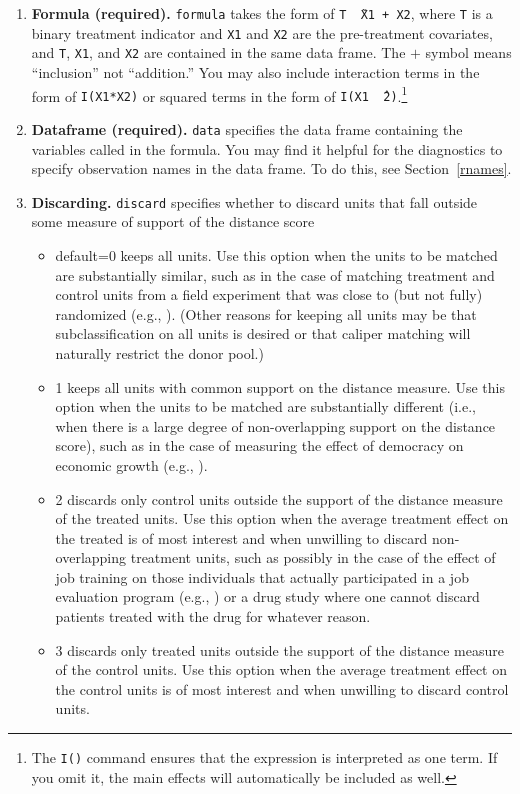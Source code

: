 \documentclass[oneside,letterpaper,titlepage]{article}
\begin{document}
\begin{enumerate}

\item \textbf{Formula (required).}  \texttt{formula}  takes the form of {\tt T \~\ X1 + X2}, where
  {\tt T} is a binary treatment indicator and {\tt X1} and {\tt X2} are
  the pre-treatment covariates, and {\tt T}, {\tt X1}, and {\tt X2}
  are contained in the same data frame.  The $+$ symbol means
  ``inclusion'' not ``addition.'' You may also include
  interaction terms in the form of {\tt I(X1*X2)} or squared terms in
  the form of {\tt I(X1 \^\ 2)}.\footnote{The \texttt{I()} command
  ensures that the expression is interpreted as one term.  If you omit
  it, the main effects will automatically be included as well.} 
  
\item \textbf{Dataframe (required).}  \texttt{data} specifies the data frame containing the
  variables called in the formula.  You may find it helpful for the
  diagnostics to specify observation names in the data frame.  To do
  this, see Section~\ref{rnames}.

\item \textbf{Discarding.} \texttt{discard} specifies whether to discard units that
  fall outside some measure of support of the distance score
  \begin{itemize}
  \item default=0 keeps all units.  Use this
    option when the units to be matched are substantially similar,
    such as in the case of matching treatment and control units from a
    field experiment that was close to (but not fully) randomized
    (e.g., \citealt{Imai03}).  (Other reasons for
    keeping all units may be that subclassification on all units is
    desired or that caliper matching will naturally restrict the donor
    pool.)
  \item  1 keeps all units with common support on the distance
    measure. Use this option when the units to be
    matched are substantially different (i.e., when there is a large
    degree of non-overlapping support on the distance score), such as
    in the case of measuring the effect of democracy on economic
    growth (e.g., \citealt{KinZen03}).  
  \item 2 discards only control units outside the support of the
    distance measure of the treated units.
    Use this option when the average treatment effect on the treated
    is of most interest and when unwilling to discard non-overlapping
    treatment units, such as possibly in the case of the effect of job
    training on those individuals that actually participated in a job
    evaluation program (e.g., \citealt{HecIchTod98}) or a drug study
    where one cannot discard patients treated with the drug for
    whatever reason. 
  \item 3 discards only treated units outside the support of 
    the distance measure of the control units.  Use this option when
    the average treatment effect on the control units is of most
    interest and when unwilling to discard control units. 
  \end{itemize}


\end{enumerate}
\end{document}
